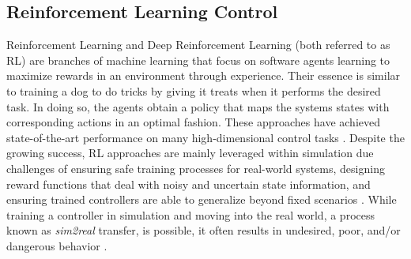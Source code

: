 \documentclass[manuscript,screen,review]{acmart}
\begin{document}





\subsection{Reinforcement Learning Control}
Reinforcement Learning and Deep Reinforcement Learning (both referred to as RL) are branches of machine learning that focus on software agents learning to maximize rewards in an environment through experience. Their essence is similar to training a dog to do tricks by giving it treats when it performs the desired task. In doing so, the agents obtain a policy that maps the systems states with corresponding actions in an optimal fashion. These approaches have achieved state-of-the-art performance on many high-dimensional control tasks \cite{lillicrap2015continuous, schulman2017proximal, mania2018simple, haarnoja2018soft}. Despite the growing success, RL approaches are mainly leveraged within simulation due challenges of ensuring safe training processes for real-world systems, designing reward functions that deal with noisy and uncertain state information, and ensuring trained controllers are able to generalize beyond fixed scenarios \cite{dulac2019challenges}. While training a controller in simulation and moving into the real world, a process known as \emph{sim2real} transfer, is possible, it often results in undesired, poor, and/or dangerous behavior \cite{jang2019ICCPS, kadian2019we}.
\end{document}
